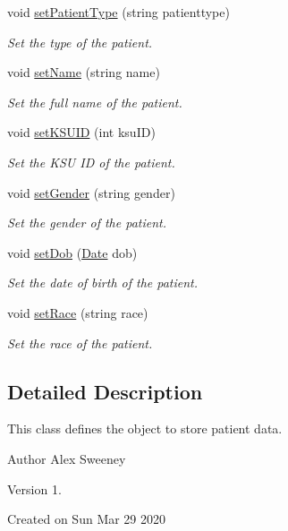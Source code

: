 \begin{DoxyCompactItemize}
void \hyperlink{classPatient_ae2a86b85bcc96d524aa3cdf8e3b4eb1d}{set\-Patient\-Type} (string patienttype)
\begin{DoxyCompactList}\small\item\em Set the type of the patient. \end{DoxyCompactList}\item 
void \hyperlink{classPatient_a2e46826f0c95fdf8f6f1f4f685176658}{set\-Name} (string name)
\begin{DoxyCompactList}\small\item\em Set the full name of the patient. \end{DoxyCompactList}\item 
void \hyperlink{classPatient_a1db1579eb65b1c33e01319cd96ed5249}{set\-K\-S\-U\-I\-D} (int ksu\-I\-D)
\begin{DoxyCompactList}\small\item\em Set the K\-S\-U I\-D of the patient. \end{DoxyCompactList}\item 
void \hyperlink{classPatient_a83af64a0500ef639cd11a610c1fce357}{set\-Gender} (string gender)
\begin{DoxyCompactList}\small\item\em Set the gender of the patient. \end{DoxyCompactList}\item 
void \hyperlink{classPatient_a24138f2d4c26928048a5af538a18d7fb}{set\-Dob} (\hyperlink{structDate}{Date} dob)
\begin{DoxyCompactList}\small\item\em Set the date of birth of the patient. \end{DoxyCompactList}\item 
void \hyperlink{classPatient_ab1f73f7a754d309d4cdff9a38784819c}{set\-Race} (string race)
\begin{DoxyCompactList}\small\item\em Set the race of the patient. \end{DoxyCompactList}\end{DoxyCompactItemize}


\subsection{Detailed Description}
This class defines the object to store patient data.

\begin{DoxyAuthor}{Author}
Alex Sweeney
\end{DoxyAuthor}
\begin{DoxyVersion}{Version}
1.
\end{DoxyVersion}
Created on Sun Mar 29 2020 

